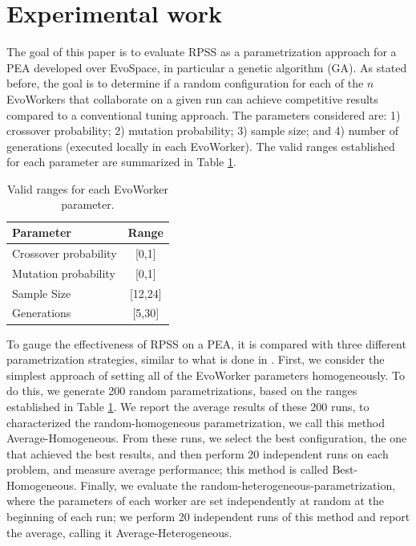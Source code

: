 \documentclass{sig-alternate}
\begin{document}
\section{Experimental work}
\label{sec:experiments}
The goal of this paper is to evaluate RPSS as a parametrization approach for a PEA developed over EvoSpace,
in particular a genetic algorithm (GA).
As stated before, the goal is to determine if a random configuration for each of the $n$ EvoWorkers that collaborate on a given run
can achieve competitive results compared to a conventional tuning approach.
The parameters considered are: 1) crossover probability; 2) mutation probability; 3) sample size;
and 4) number of generations (executed locally in each EvoWorker).
The valid ranges established for each parameter are summarized in Table \ref{tab:params}.

\begin{table}[!t]
\caption{Valid ranges for each EvoWorker parameter.}
\label{tab:params}
\centering
\begin{tabular}{|l|c|}
\hline
\textbf{Parameter} & \textbf{Range} \\
\hline
\hline
Crossover probability & [0,1] \\
Mutation probability & [0,1] \\
Sample Size & [12,24]\\
Generations & [5,30]\\
\hline
\end{tabular}
\end{table}

To gauge the effectiveness of RPSS on a PEA, it is compared with three different parametrization strategies, similar to what is done in \cite{fuku1,fuku2}.
First, we consider the simplest approach of setting all of the EvoWorker parameters homogeneously.
To do this, we generate 200 random parametrizations, based on the ranges established in Table \ref{tab:params}.
We report the average results of these 200 runs, to characterized the random-homogeneous parametrization, we call this method Average-Homogeneous.
From these runs, we select the best configuration, the one that achieved the best results,
and then perform 20 independent runs on each problem, and measure average performance; this method is called Best-Homogeneous.
Finally, we evaluate the random-heterogeneous-parametrization, where the parameters of each worker are set independently at random at
the beginning of each run; we perform 20 independent runs of this method and report the average, calling it Average-Heterogeneous.
\end{document}
